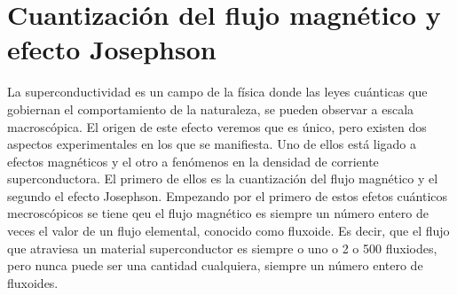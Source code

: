 \section{Cuantización del flujo magnético y efecto Josephson}

La superconductividad es un campo de la física donde las leyes cuánticas que gobiernan el comportamiento de la naturaleza, se pueden observar a escala macroscópica. El origen de este efecto veremos que es único, pero existen dos aspectos experimentales en los que se manifiesta. Uno de ellos está ligado a efectos magnéticos y el otro a fenómenos en la densidad de corriente superconductora. El primero de ellos es la cuantización del flujo magnético y el segundo el efecto Josephson. Empezando por el primero de estos efetos cuánticos mecroscópicos se tiene qeu el flujo magnético es siempre un número entero de veces el valor de un flujo elemental, conocido como fluxoide. Es decir, que el flujo que atraviesa un material superconductor es siempre o uno o 2 o 500 fluxiodes, pero nunca puede ser una cantidad cualquiera, siempre un número entero de fluxoides.


